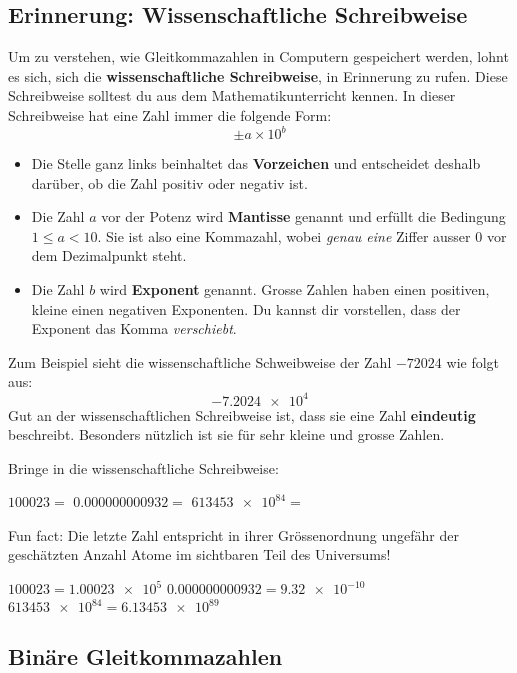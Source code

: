 \subsection{Erinnerung: Wissenschaftliche Schreibweise}

Um zu verstehen, wie Gleitkommazahlen in Computern gespeichert werden, lohnt es sich, sich die \textbf{wissenschaftliche Schreibweise}, in Erinnerung zu rufen. Diese Schreibweise solltest du aus dem Mathematikunterricht kennen. In dieser Schreibweise hat eine Zahl immer die folgende Form:
$$\pm a \times 10^b$$
\begin{itemize}
	\item Die Stelle ganz links beinhaltet das \textbf{Vorzeichen} und entscheidet deshalb darüber, ob die Zahl positiv oder negativ ist.
	\item Die Zahl $a$ vor der Potenz wird \textbf{Mantisse} genannt und erfüllt die Bedingung $1\leq a < 10$. Sie ist also eine Kommazahl, wobei \textit{genau eine} Ziffer ausser $0$ vor dem Dezimalpunkt steht.
	\item Die Zahl $b$ wird \textbf{Exponent} genannt. Grosse Zahlen haben einen positiven, kleine einen negativen Exponenten. Du kannst dir vorstellen, dass der Exponent das Komma \textit{verschiebt}.
\end{itemize}
Zum Beispiel sieht die wissenschaftliche Schweibweise der Zahl $-72024$ wie folgt aus:
$$-\num{7.2024e4}$$
Gut an der wissenschaftlichen Schreibweise ist, dass sie eine Zahl \textbf{eindeutig} beschreibt. Besonders nützlich ist sie für sehr kleine und grosse Zahlen.

\begin{question}
	Bringe in die wissenschaftliche Schreibweise:
	\begin{tasks}
		\task $\num{100023}=$
		\task $\num{0.000000000932}=$
		\task $\num{613453e84}=$
	\end{tasks}
	Fun fact: Die letzte Zahl entspricht in ihrer Grössenordnung ungefähr der geschätzten Anzahl Atome im sichtbaren Teil des Universums!
\end{question}
\begin{solution}	
	\begin{tasks}
		\task $\num{100023}=\num{1.00023e5}$
		\task $\num{0.000000000932}=\num{9.32e-10}$
		\task $\num{613453e84}=\num{6.13453e89}$
	\end{tasks}
\end{solution}

\newpage

\subsection{Binäre Gleitkommazahlen}

